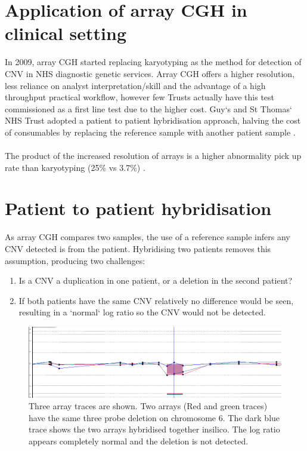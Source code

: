 \section{Application of array CGH in clinical setting}
In 2009, array CGH started replacing karyotyping as the method for detection of CNV in NHS diagnostic genetic services. Array CGH offers a higher resolution, less reliance on analyst interpretation/skill and the advantage of a high throughput practical workflow, however few Trusts actually have this test commissioned as a first line test due to the higher cost. Guy`s and St Thomas` NHS Trust adopted a patient to patient hybridisation approach, halving the cost of consumables by replacing the reference sample with another patient sample \cite{ahn2010}.

\paragraph*{}
The product of the increased resolution of arrays is a higher abnormality pick up rate than karyotyping (25\% vs 3.7\%) \cite{ahn2013,jordan_microarrays_2012}. 

\section{Patient to patient hybridisation}
As array CGH compares two samples, the use of a reference sample infers any CNV detected is from the patient. Hybridising two patients removes this assumption, producing two challenges:
\begin{enumerate}
\item Is a CNV a duplication in one patient, or a deletion in the second patient?
\item If both patients have the same CNV relatively no difference would be seen, resulting in a `normal` log ratio so the CNV would not be detected.
\end{enumerate}
\begin{figure}
\centering
\includegraphics[width=\linewidth]{./Figures/SharedImbalance.jpg}
\caption[A trace showing how a shared imbalance would not be detected]{Three array traces are shown. Two arrays (Red and green traces) have the same three probe deletion on chromosome 6. The dark blue trace shows the two arrays hybridised together insilico. The log ratio appears completely normal and the deletion is not detected.}
\label{fig:SharedImbalance}
\end{figure}

